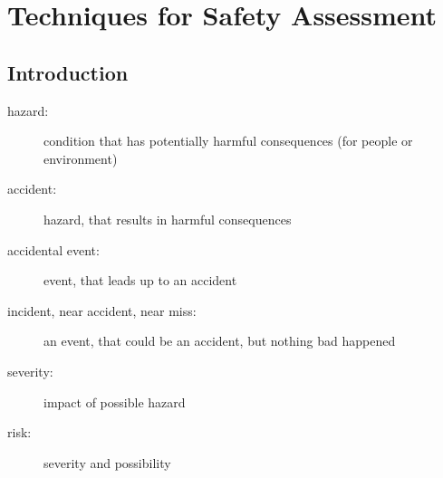 \documentclass[a4paper, 10pt]{article}
\begin{document}





\section*{Techniques for Safety Assessment}
\subsection*{Introduction}
\begin{description}
    \item[hazard:] condition that has potentially harmful consequences (for people or environment)
    \item[accident:] hazard, that results in harmful consequences
    \item[accidental event:] event, that leads up to an accident
    \item[incident, near accident, near miss:] an event, that could be an accident, but nothing bad happened
    \item[severity:] impact of possible hazard
    \item[risk:] severity and possibility
\end{description}
\end{document}
